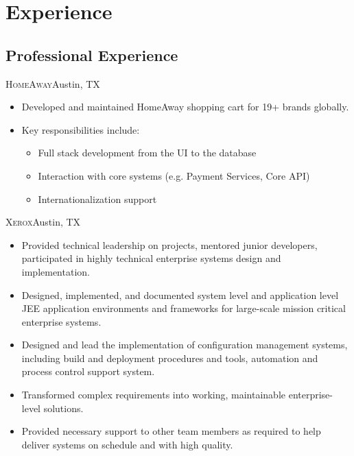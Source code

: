 \documentclass[11pt,letterpaper,sans]{moderncv}
\begin{document}

\section{Experience}

  \subsection{Professional Experience}
     {\textsc{HomeAway}}{Austin, TX}{}
     {\begin{itemize}
         \item Developed and maintained HomeAway shopping cart for 19+
               brands globally.
         \item Key responsibilities include:
               {\begin{itemize}
                   \item Full stack development from the UI to the
                         database
                   \item Interaction with core systems (e.g. Payment
                         Services, Core API)
                   \item Internationalization support
                \end{itemize}}
     \end{itemize}}

     {\textsc{Xerox}}{Austin, TX}{}
     {\begin{itemize}
         \item Provided technical leadership on projects, mentored junior 
               developers, participated in highly technical enterprise 
               systems design and implementation.
         \item Designed, implemented, and documented system level and 
               application level JEE application environments and frameworks 
               for large-scale mission critical enterprise systems.
         \item Designed and lead the implementation of configuration 
               management systems, including build and deployment procedures 
               and tools, automation and process control support system.
         \item Transformed complex requirements into working, maintainable 
               enterprise-level solutions.
         \item Provided necessary support to other team members as required 
               to help deliver systems on schedule and with high quality.
     \end{itemize}}
      
\end{document}

